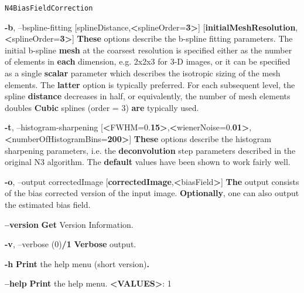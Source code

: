 \documentclass[ignorenonframetext,]{beamer}
\newenvironment{Shaded}{\begin{snugshade}}{\end{snugshade}}
\newcommand{\KeywordTok}[1]{\textcolor[rgb]{0.13,0.29,0.53}{\textbf{{#1}}}}
\newcommand{\NormalTok}[1]{{#1}}
\begin{document}
\begin{frame}[fragile]{\texttt{N4BiasFieldCorrection}}
\begin{Shaded}
\begin{Highlighting}[]
     \KeywordTok{-b}\NormalTok{, --bspline-fitting [splineDistance,}\KeywordTok{<}\NormalTok{splineOrder=}\KeywordTok{3>}\NormalTok{]}
                           \NormalTok{[}\KeywordTok{initialMeshResolution}\NormalTok{,}\KeywordTok{<}\NormalTok{splineOrder=}\KeywordTok{3>}\NormalTok{]}
          \KeywordTok{These} \NormalTok{options describe the b-spline fitting parameters. The initial b-spline}
          \KeywordTok{mesh} \NormalTok{at the coarsest resolution is specified either as the number of elements in}
          \KeywordTok{each} \NormalTok{dimension, e.g. 2x2x3 for 3-D images, or it can be specified as a single}
          \KeywordTok{scalar} \NormalTok{parameter which describes the isotropic sizing of the mesh elements. The}
          \KeywordTok{latter} \NormalTok{option is typically preferred. For each subsequent level, the spline}
          \KeywordTok{distance} \NormalTok{decreases in half, or equivalently, the number of mesh elements doubles}
          \KeywordTok{Cubic} \NormalTok{splines (order = 3) }\KeywordTok{are} \NormalTok{typically used.}

     \KeywordTok{-t}\NormalTok{, --histogram-sharpening [}\KeywordTok{<}\NormalTok{FWHM=0.}\KeywordTok{15>}\NormalTok{,}\KeywordTok{<}\NormalTok{wienerNoise=0.}\KeywordTok{01>}\NormalTok{,}\KeywordTok{<}\NormalTok{numberOfHistogramBins=}\KeywordTok{200>}\NormalTok{]}
          \KeywordTok{These} \NormalTok{options describe the histogram sharpening parameters, i.e. the}
          \KeywordTok{deconvolution} \NormalTok{step parameters described in the original N3 algorithm. The}
          \KeywordTok{default} \NormalTok{values have been shown to work fairly well.}

     \KeywordTok{-o}\NormalTok{, --output correctedImage}
                  \NormalTok{[}\KeywordTok{correctedImage}\NormalTok{,}\KeywordTok{<}\NormalTok{biasField}\KeywordTok{>}\NormalTok{]}
          \KeywordTok{The} \NormalTok{output consists of the bias corrected version of the input image.}
          \KeywordTok{Optionally}\NormalTok{, one can also output the estimated bias field.}

     \KeywordTok{--version}
          \KeywordTok{Get} \NormalTok{Version Information.}

     \KeywordTok{-v}\NormalTok{, --verbose (0)}\KeywordTok{/1}
          \KeywordTok{Verbose} \NormalTok{output.}

     \KeywordTok{-h}
          \KeywordTok{Print} \NormalTok{the help menu (short version)}\KeywordTok{.}

     \KeywordTok{--help}
          \KeywordTok{Print} \NormalTok{the help menu.}
          \KeywordTok{<VALUES>}\NormalTok{: 1}
\end{Highlighting}
\end{Shaded}


\end{frame}
\end{document}
